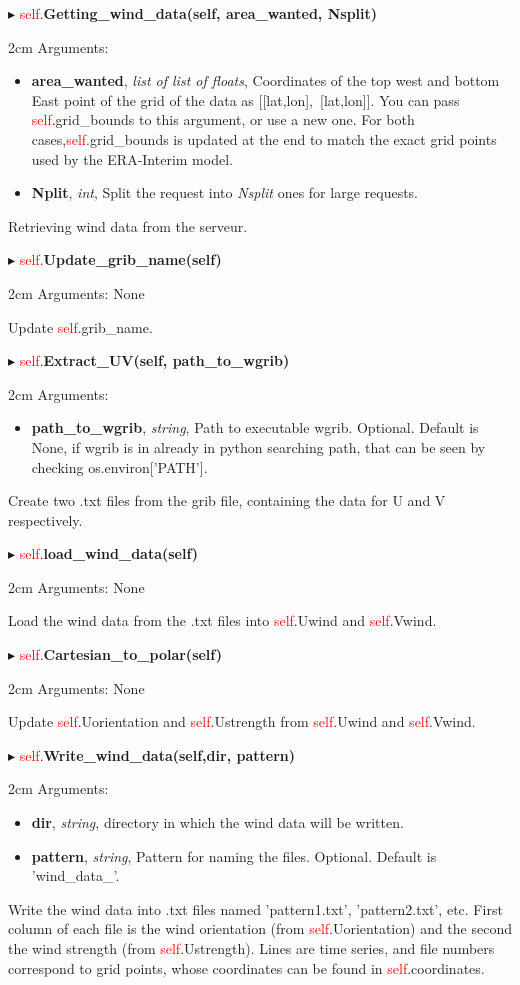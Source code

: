 \documentclass[12pt]{article}
\newenvironment{myenv}{\begin{adjustwidth}{2cm}{}}{\end{adjustwidth}}
\newcommand{\ClassFunction}[3]{\filbreak\noindent
$\blacktriangleright$ \quad \textcolor{red}{self}.\textbf{#1}

\begin{myenv}
Arguments: {#2}

{#3}
\end{myenv}
\vspace*{0.4 cm}}
\newcommand{\Argument}[3]{\noindent 
\textbf{#1}, \textit{#2}, {#3}}
\begin{document}
\ClassFunction{Getting\_wind\_data(self, area\_wanted, Nsplit)}{
\begin{itemize}
	\item \Argument{area\_wanted}{list of list of floats}{Coordinates of the top west and bottom East point of the grid of the data as [[lat,lon],~[lat,lon]]. You can pass \textcolor{red}{self}.grid\_bounds to this argument, or use a new one. For both cases,\textcolor{red}{self}.grid\_bounds is updated at the end to match the exact grid points used by the ERA-Interim model.}
	\item \Argument{Nplit}{int}{Split the request into \textit{Nsplit} ones for large requests.}
\end{itemize}
}{Retrieving wind data from the serveur.}

\ClassFunction{Update\_grib\_name(self)}{None}{Update \textcolor{red}{self}.grib\_name.}

\ClassFunction{Extract\_UV(self, path\_to\_wgrib)}{
\begin{itemize}
\item \Argument{path\_to\_wgrib}{string}{Path to executable wgrib. Optional. Default is None, if wgrib is in already in python searching path, that can be seen by checking os.environ['PATH'].}
\end{itemize}
}{Create two .txt files from the grib file, containing the data for U and V respectively.}

\ClassFunction{load\_wind\_data(self)}{None}{Load the wind data from the .txt files into \textcolor{red}{self}.Uwind and \textcolor{red}{self}.Vwind.}

\ClassFunction{Cartesian\_to\_polar(self)}{None}{Update \textcolor{red}{self}.Uorientation and \textcolor{red}{self}.Ustrength from \textcolor{red}{self}.Uwind and \textcolor{red}{self}.Vwind.}

\ClassFunction{Write\_wind\_data(self,dir, pattern)}{
\begin{itemize}
	\item \Argument{dir}{string}{directory in which the wind data will be written.}
	\item \Argument{pattern}{string}{Pattern for naming the files. Optional. Default is 'wind\_data\_'.}
\end{itemize}
}{Write the wind data into .txt files named 'pattern1.txt', 'pattern2.txt', etc. First column of each file is the wind orientation (from \textcolor{red}{self}.Uorientation) and the second the wind strength (from \textcolor{red}{self}.Ustrength). Lines are time series, and file numbers correspond to grid points, whose coordinates can be found in \textcolor{red}{self}.coordinates.}
\end{document}
